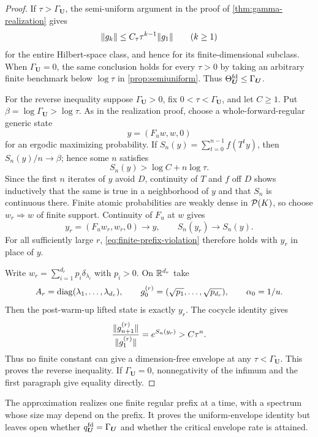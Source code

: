 \documentclass[letterpaper,twoside]{article}
\begin{document}
\begin{proof}
If $\tau>\Gamma_{\bm U}$, the semi-uniform argument in the proof of
\cref{thm:gamma-realization} gives
\[
 \lVert g_k\rVert\le C_\tau\tau^{k-1}\lVert g_1\rVert\qquad(k\ge1)
\]
for the entire Hilbert-space class, and hence for its finite-dimensional
subclass.  When $\Gamma_{\bm U}=0$, the same conclusion holds for every
$\tau>0$ by taking an arbitrary finite benchmark below $\log\tau$ in
\cref{prop:semiuniform}.  Thus
$\Theta^{\rm fd}_{\bm U}\le\Gamma_{\bm U}$.

For the reverse inequality suppose $\Gamma_{\bm U}>0$, fix
$0<\tau<\Gamma_{\bm U}$, and let $C\ge1$.  Put
$\beta=\log\Gamma_{\bm U}>\log\tau$.  As in the realization proof, choose a
whole-forward-regular generic state
\[
 y=(F_u w,w,0)
\]
for an ergodic maximizing probability.  If
$S_n(y)=\sum_{t=0}^{n-1}f(T^ty)$, then $S_n(y)/n\to\beta$; hence some $n$
satisfies
\begin{equation}\label{eq:finite-prefix-violation}
 S_n(y)>\log C+n\log\tau.
\end{equation}
Since the first $n$ iterates of $y$ avoid $D$, continuity of $T$ and $f$ off
$D$ shows inductively that the same is true in a neighborhood of $y$ and that
$S_n$ is continuous there.  Finite atomic probabilities are weakly dense in
$\mathcal P(K)$, so choose $w_r\Rightarrow w$ of finite support.  Continuity of $F_u$
at $w$ gives
\[
 y_r=(F_u w_r,w_r,0)\longrightarrow y,
 \qquad S_n(y_r)\longrightarrow S_n(y).
\]
For all sufficiently large $r$, \eqref{eq:finite-prefix-violation} therefore
holds with $y_r$ in place of $y$.

Write $w_r=\sum_{i=1}^{d_r}p_i\delta_{\lambda_i}$ with $p_i>0$.  On
$\mathbb R^{d_r}$ take
\[
 A_r=\operatorname{diag}(\lambda_1,\ldots,\lambda_{d_r}),
 \qquad g_0^{(r)}=(\sqrt{p_1},\ldots,\sqrt{p_{d_r}}),
 \qquad \alpha_0=1/u.
\]
Then the post-warm-up lifted state is exactly $y_r$.  The cocycle identity
gives
\[
 \frac{\lVert g_{n+1}^{(r)}\rVert}{\lVert g_1^{(r)}\rVert}
 =e^{S_n(y_r)}>C\tau^n.
\]
Thus no finite constant can give a dimension-free envelope at any
$\tau<\Gamma_{\bm U}$.  This proves the reverse inequality.  If
$\Gamma_{\bm U}=0$, nonnegativity of the infimum and the first paragraph give
equality directly.
\end{proof}

The approximation realizes one finite regular prefix at a time, with a
spectrum whose size may depend on the prefix.  It proves the uniform-envelope
identity but leaves open whether $q^{\rm fd}_{\bm U}=\Gamma_{\bm U}$ and
whether the critical envelope rate is attained.
\end{document}
